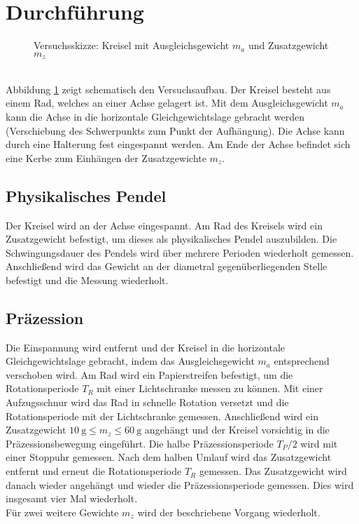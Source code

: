\section{Durchführung}
\begin{figure}[!htbp]
\centering
\resizebox{0.8\textwidth}{!}{}
\caption{Versuchsskizze: Kreisel mit Ausgleichsgewicht $m_a$ und Zusatzgewicht $m_z$}
\label{img:3}
\end{figure}\ \\
Abbildung \ref{img:3} zeigt schematisch den Versuchsaufbau. Der Kreisel besteht aus einem Rad, welches an einer Achse gelagert ist. Mit dem Ausgleichsgewicht $m_a$ kann die Achse in die horizontale Gleichgewichtslage gebracht werden (Verschiebung des Schwerpunkts zum Punkt der Aufhängung). Die Achse kann durch eine Halterung fest eingespannt werden. Am Ende der Achse befindet sich eine Kerbe zum Einhängen der Zusatzgewichte $m_z$.
\subsection{Physikalisches Pendel}
Der Kreisel wird an der Achse eingespannt. Am Rad des Kreisels wird ein Zusatzgewicht befestigt, um dieses als physikalisches Pendel auszubilden. Die Schwingungsdauer des Pendels wird über mehrere Perioden wiederholt gemessen. Anschließend wird das Gewicht an der diametral gegenüberliegenden Stelle befestigt und die Messung wiederholt.
\subsection{Präzession}
Die Einspannung wird entfernt und der Kreisel in die horizontale Gleichgewichtslage gebracht, indem das Ausgleichsgewicht $m_a$ entsprechend verschoben wird. Am Rad wird ein Papierstreifen befestigt, um die Rotationsperiode $T_R$ mit einer Lichtschranke messen zu können. Mit einer Aufzugsschnur wird das Rad in schnelle Rotation versetzt und die Rotationsperiode mit der Lichtschranke gemessen. Anschließend wird ein Zusatzgewicht $\SI{10}{\g} \leq m_z \leq \SI{60}{\g}$ angehängt und der Kreisel vorsichtig in die Präzessionsbewegung eingeführt. Die halbe Präzessionsperiode $T_P/2$ wird mit einer Stoppuhr gemessen. Nach dem halben Umlauf wird das Zusatzgewicht entfernt und erneut die Rotationsperiode $T_R$ gemessen. Das Zusatzgewicht wird danach wieder angehängt und wieder die Präzessionsperiode gemessen. Dies wird insgesamt vier Mal wiederholt.\\
Für zwei weitere Gewichte $m_z$ wird der beschriebene Vorgang wiederholt.
